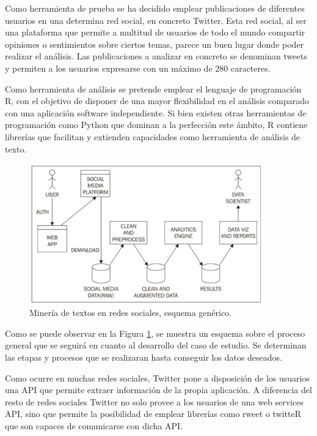 Como herramienta de prueba se ha decidido emplear publicaciones de diferentes usuarios en una determina 
red social, en concreto Twitter. Esta red social, al ser una plataforma que permite a multitud de usuarios de 
todo el mundo compartir opiniones o sentimientos sobre ciertos temas, parece un buen lugar donde poder 
realizar el análisis. Las publicaciones a analizar en concreto se denominan tweets y permiten a los usuarios 
expresarse con un máximo de 280 caracteres.

Como herramienta de análisis se pretende emplear el lenguaje de programación R, con el objetivo de disponer 
de una mayor flexibilidad en el análisis comparado con una aplicación software independiente. Si bien existen
otras herramientas de programación como Python que dominan a la perfección este ámbito, R contiene librerías 
que facilitan y extienden capacidades como herramienta de análisis de texto.

\begin{figure}[tphb]
  \centering
  \includegraphics[width=4in]{text-mining-diagram.png}
  \caption{Minería de textos en redes sociales, esquema genérico.}
  \label{img:data-mining-process}
\end{figure}

Como se puede observar en la Figura \ref{img:data-mining-process}, se muestra un esquema sobre el proceso 
general que se seguirá en  cuanto al desarrollo del caso de estudio. Se determinan las etapas y procesos que se 
realizaran hasta conseguir los datos deseados.\cite{esquema-text-mining}

Como ocurre en muchas redes sociales, Twitter pone a disposición de los usuarios una API \cite{api-twitter} que
permite extraer información de la propia aplicación. A diferencia del resto de redes sociales Twitter no solo provee a los usuarios 
de una web services API, sino que permite la posibilidad de emplear librerías como rweet o twitteR que son capaces de 
comunicarse con dicha API.

